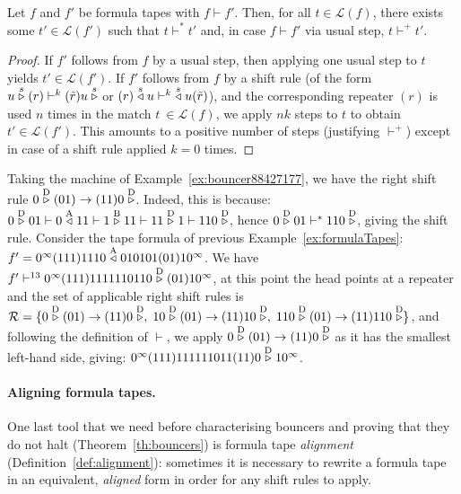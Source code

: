 \begin{lemma}\label{lem:vdashFormulaTapes} Let $f$ and $f'$ be formula tapes with $f \vdash f'$. Then, for all $t \in \mathcal{L}(f)$, there exists some $t' \in \mathcal{L}(f')$ such that $t \vdash^* t'$
    and, in case $f \vdash f'$ via usual step, $t \vdash^+ t'$.
\end{lemma}
\begin{proof}
    If $f'$ follows from $f$ by a usual step, then applying one usual step to $t$ yields $t'\in\mathcal{L}(f')$. If $f'$ follows from $f$ by a shift rule (of the form $u \stackrel{s}\triangleright(r) \vdash^k (\tilde{r})u\stackrel{s}\triangleright$ or $(r)\stackrel{s}\triangleleft u \vdash^k \;\stackrel{s}\triangleleft u(\tilde{r})$), and the corresponding repeater $(r)$ is used $n$ times in the match $t\ \in \mathcal{L}(f)$, we apply $nk$ steps to $t$ to obtain $t' \in \mathcal{L}(f')$. This amounts to a positive number of steps (justifying $\vdash^+$)  except in case of a shift rule applied $k=0$ times.
\end{proof}


\begin{example}\label{ex:shiftRules}
    Taking the machine of Example~\ref{ex:bouncer88427177}, we have the right shift rule $0 \stackrel{\text{D}}\triangleright(01) \to (11)0\stackrel{\text{D}}\triangleright$. Indeed, this is because: $0 \stackrel{\text{D}}\triangleright01 \vdash 0\stackrel{\text{A}}\triangleleft11 \vdash 1\stackrel{\text{B}}\triangleright11 \vdash 11\stackrel{\text{D}}\triangleright1 \vdash 110\stackrel{\text{D}}\triangleright$, hence $0 \stackrel{\text{D}}\triangleright01 \vdash^* 110\stackrel{\text{D}}\triangleright$, giving the shift rule. Consider the tape formula of previous Example~\ref{ex:formulaTapes}: $f' = 0^\infty(111)1110 \stackrel{\text{A}}\triangleleft 010101(01)10^\infty$. We have $f' \vdash^{13} 0^\infty (111)1111110110 \stackrel{\text{D}}\triangleright (01) 10^\infty$, at this point the head points at a repeater and the set of applicable right shift rules is $\mathcal{R} = \{ 0 \stackrel{\text{D}}\triangleright(01) \to (11)0\stackrel{\text{D}}\triangleright,\; 10 \stackrel{\text{D}}\triangleright(01) \to (11)10\stackrel{\text{D}}\triangleright,\; 110 \stackrel{\text{D}}\triangleright(01) \to (11)110\stackrel{\text{D}}\triangleright\}$, and following the definition of $\vdash$, we apply $0 \stackrel{\text{D}}\triangleright(01) \to (11)0\stackrel{\text{D}}\triangleright$ as it has the smallest left-hand side, giving: $0^\infty (111)111111011(11)0 \stackrel{\text{D}}\triangleright 10^\infty$.

\end{example}

\paragraph*{Aligning formula tapes.} One last tool that we need before characterising bouncers and proving that they do not halt (Theorem~\ref{th:bouncers}) is formula tape \textit{alignment} (Definition~\ref{def:alignment}): sometimes it is necessary to rewrite a formula tape in an equivalent, \textit{aligned} form in order for any shift rules to apply.

